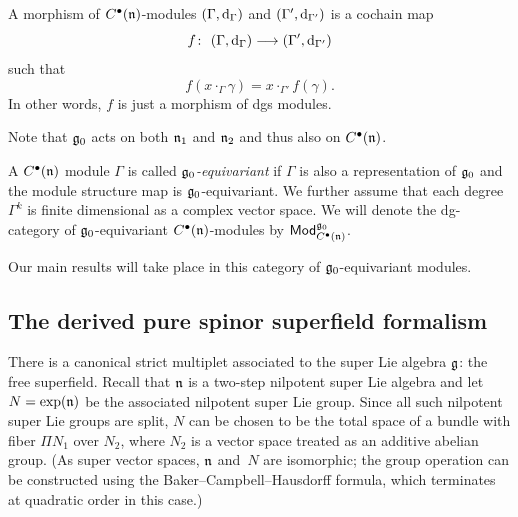 \documentclass[pdftex]{sigma}
\numberwithin{equation}{section}
\def\cat#1{\ensuremath{\mathsf{#1}}}
\DeclareMathOperator{\Mod}{\cat{Mod}}
\def\d{{\rm d}}
\begin{document}
\begin{dfn}
	A morphism of $C^\bullet(\mathfrak n)$-modules $(\Gamma , \d_\Gamma)$ and $(\Gamma' , \d_{\Gamma'})$ is a cochain map
	\begin{equation*}
	f \colon \ (\Gamma , \d_\Gamma) \longrightarrow (\Gamma' , \d_{\Gamma'})
	\end{equation*}
	such that
	\begin{equation*}
	f(x \cdot_\Gamma \gamma) = x \cdot_{\Gamma'} f(\gamma) .
	\end{equation*}
	In other words, $f$ is just a morphism of dgs modules.
\end{dfn}
Note that $\mathfrak g_0$ acts on both $\mathfrak n_1$ and $\mathfrak n_2$ and thus also on $C^\bullet(\mathfrak n)$.

\begin{dfn}
	A $C^\bullet(\mathfrak n)$ module $\Gamma$ is called \emph{$\mathfrak g_0$-equivariant} if $\Gamma$ is also a representation of $\mathfrak g_0$ and the module structure map is $\mathfrak g_0$-equivariant. We further assume that each degree $\Gamma^k$ is finite dimensional as a complex vector space. We will denote the dg-category of $\mathfrak g_0$-equivariant $C^\bullet(\mathfrak n)$-modules by $\Mod_{C^\bullet(\fn)}^{\fg_0}$.
\end{dfn}

Our main results will take place in this category of $\mathfrak g_0$-equivariant modules.

\subsection{The derived pure spinor superfield formalism}

There is a canonical strict multiplet associated to the super Lie algebra $\mathfrak g$: the free superfield. Recall that $\mathfrak n$ is a two-step nilpotent super Lie algebra and let $N = \exp(\mathfrak n)$ be the associated nilpotent super Lie group. Since all such nilpotent super Lie groups are split, $N$ can be chosen to be the total space of a bundle with fiber $\Pi N_1$ over $N_2$, where $N_2$ is a vector space treated as an additive abelian group. (As super vector spaces, $\mathfrak n$ and~$N$ are isomorphic; the group operation can be constructed using the Baker--Campbell--Hausdorff formula, which terminates at quadratic order in this case.)
\end{document}
